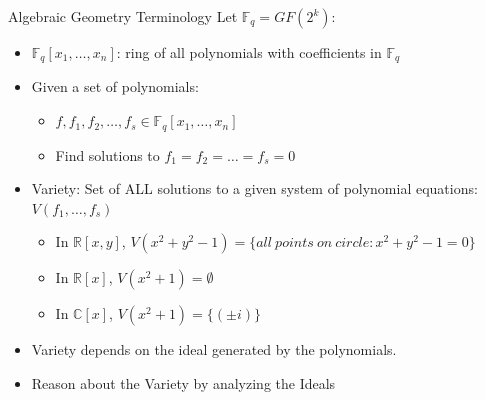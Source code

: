 \documentclass[xcolor=dvipsnames]{beamer}
\begin{document}
\begin{frame}{\large{Algebraic Geometry Terminology}}
\vspace{-0.2in}
Let $\mathbb{F}_q = GF(2^k)$:
\begin{itemize}
\item $\mathbb{F}_q[x_1, \ldots, x_n]$: ring of all polynomials with
  coefficients in $\mathbb{F}_q$ 
\item Given a set of polynomials:
\begin{itemize}
\item $f, f_1, f_2, \dots , f_s \in \mathbb{F}_q[x_1, \dots, x_n]$
\item Find solutions to $f_1 = f_2 = \dots = f_s = 0$
\end{itemize}
\item \alert{Variety:} Set of ALL solutions to a given system of polynomial equations: $V(f_1, \dots, f_s)$
	\begin{itemize}
	\item In $\mathbb{R}\left[x,y\right]$, $V(x^2+y^2-1)=\{all\  points\  on\ circle: x^2+y^2-1=0\}$
	\item In $\mathbb{R}[x]$, $V(x^2+1)=\emptyset$
	\item In $\mathbb{C}[x]$, $V(x^2+1)=\{(\pm i)\}$
	\end{itemize}
\item Variety depends on the \alert{ideal} generated by the polynomials.
\item Reason about the Variety by analyzing the Ideals
\end{itemize}


\end{frame}
\end{document}
